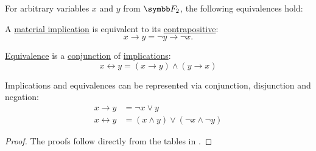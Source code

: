 \begin{proposition}\label{thm:boolean_function_equivalences}
  For arbitrary variables \( x \) and \( y \) from \( \BF_2 \), the following equivalences hold:
  \begin{PropEnum}
     A \hyperref[def:material_implication]{material implication} is equivalent to its \hyperref[def:material_implication/contrapositive]{contrapositive}:
    \begin{equation}\label{eq:def:boolean_equivalences/contrapositive}
      x \rightarrow y = \neg y \rightarrow \neg x.
    \end{equation}

     \hyperref[def:propositional_alphabet/connectives/equivalence]{Equivalence} is a \hyperref[def:propositional_alphabet/connectives/conjunction]{conjunction} of \hyperref[def:material_implication]{implications}:
    \begin{equation}\label{eq:def:boolean_equivalences/equivalence_via_implication/axiom}
      x \leftrightarrow y = (x \rightarrow y) \wedge (y \rightarrow x)
    \end{equation}

     Implications and equivalences can be represented via conjunction, disjunction and negation:
    \begin{align}
      x \rightarrow y     &= \neg x \vee y                            \label{eq:def:boolean_equivalences/connectives_via_and_or/implies} \\
      x \leftrightarrow y &= (x \wedge y) \vee (\neg x \wedge \neg y) \label{eq:def:boolean_equivalences/connectives_via_and_or/iff}
    \end{align}
  \end{PropEnum}
\end{proposition}
\begin{proof}
  The proofs follow directly from the tables in .
\end{proof}

